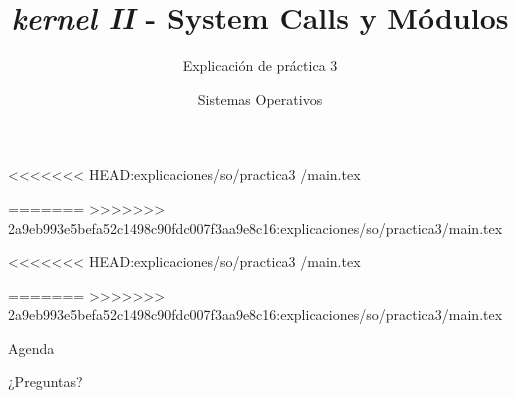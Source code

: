 


<<<<<<< HEAD:explicaciones/so/practica3 /main.tex

=======
>>>>>>> 2a9eb993e5befa52c1498c90fdc007f3aa9e8c16:explicaciones/so/practica3/main.tex
\title{\textit{kernel II} - System Calls y Módulos}
\author{Sistemas Operativos}
\subtitle{Explicación de práctica 3}

<<<<<<< HEAD:explicaciones/so/practica3 /main.tex

=======
>>>>>>> 2a9eb993e5befa52c1498c90fdc007f3aa9e8c16:explicaciones/so/practica3/main.tex


\begin{frame}
  \titlepage
\end{frame}

\begin{frame}{Agenda}
  \tableofcontents
\end{frame}







\begin{frame}{}
  \begin{center}
    \vfill
    \huge ¿Preguntas?
    \vfill
  \end{center}
\end{frame}


